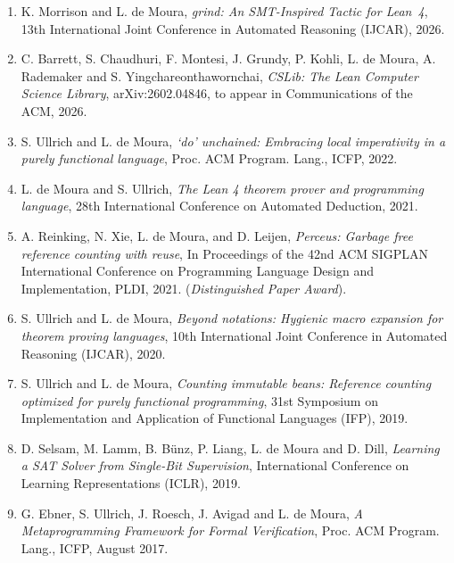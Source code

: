 \documentclass[11pt,a4paper]{article}
\begin{document}
\begin{enumerate}[leftmargin=*,itemsep=0.5ex,topsep=0.6ex]

\item K. Morrison and L. de Moura,
    {\em grind: An SMT-Inspired Tactic for Lean~4},
    13th International Joint Conference in Automated Reasoning (IJCAR), 2026.

\item C. Barrett, S. Chaudhuri, F. Montesi, J. Grundy, P. Kohli, L. de Moura, A. Rademaker and S. Yingchareonthawornchai,
      {\em CSLib: The Lean Computer Science Library},
      arXiv:2602.04846, to appear in Communications of the ACM, 2026.

\item S. Ullrich and L. de Moura,
      {\em `do' unchained: Embracing local imperativity in a purely functional language},
      Proc. ACM Program. Lang., ICFP, 2022.

\item L. de Moura and S. Ullrich,
      {\em The Lean 4 theorem prover and programming language},
      28th International Conference on Automated Deduction, 2021.

\item A. Reinking, N. Xie, L. de Moura, and D. Leijen,
      {\em Perceus: Garbage free reference counting with reuse},
      In Proceedings of the 42nd ACM SIGPLAN International Conference on Programming Language Design and Implementation, PLDI, 2021. ({\em Distinguished Paper Award}).

\item S. Ullrich and L. de Moura,
      {\em Beyond notations: Hygienic macro expansion for theorem proving languages},
      10th International Joint Conference in Automated Reasoning (IJCAR), 2020.

\item S. Ullrich and L. de Moura,
      {\em Counting immutable beans: Reference counting optimized for purely functional programming},
      31st Symposium on Implementation and Application of Functional Languages (IFP), 2019.

\item D. Selsam, M. Lamm, B. B\"unz, P. Liang, L. de Moura and D. Dill,
      {\em Learning a SAT Solver from Single-Bit Supervision},
      International Conference on Learning Representations (ICLR), 2019.

\item G. Ebner, S. Ullrich, J. Roesch, J. Avigad and L. de Moura,
      {\em A Metaprogramming Framework for Formal Verification},
      Proc. ACM Program. Lang., ICFP, August 2017.


\end{enumerate}
\end{document}
